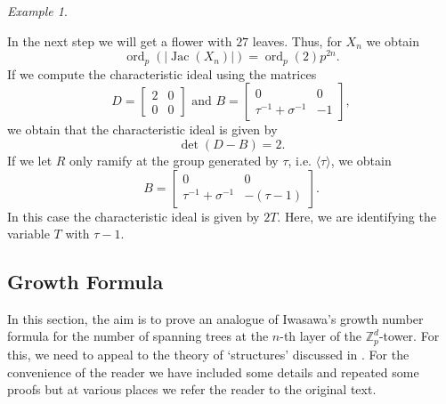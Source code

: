 \documentclass{amsart}
\numberwithin{equation}{section}
\theoremstyle{remark}
\newtheorem{example}[theorem]{Example}
\newcommand{\Jac}{\operatorname{Jac}}
\newcommand{\ord}{\operatorname{ord}}
\newcommand{\Z}{\mathbb{Z}}
\theoremstyle{plain} %
\begin{document}
\begin{example}
\begin{center}
\end{center}
In the next step we will get a flower with $27$ leaves. Thus, for $X_n$ we obtain 
\[
\ord_p(\vert \Jac(X_n)\vert)=\ord_p(2)p^{2n}.
\]
If we compute the characteristic ideal using the matrices 
\[D = \begin{bmatrix}
    2 & 0 \\
    0 & 0
\end{bmatrix} \textrm{ and } B = \begin{bmatrix}
    0 & 0 \\ 
    \tau^{-1}+\sigma^{-1} & -1
\end{bmatrix},
\]
we obtain that the characteristic ideal is given by
\[\det(D-B)=2. \]
If we let $R$ only ramify at the group generated by $\tau$, i.e. $\langle \tau\rangle$, we obtain 
\[
B=\begin{bmatrix}
    0&0\\\tau^{-1}+\sigma^{-1}&-(\tau-1)
\end{bmatrix}.
\]
In this case the characteristic ideal is given by $2T$.
{Here, we are identifying the variable $T$ with $\tau - 1$.}
\end{example}

\subsection{Growth Formula}

In this section, the aim is to prove an analogue of Iwasawa's growth number formula for the number of spanning trees at the $n$-th layer of the $\Z_p^d$-tower.
{For this, we need to appeal to the theory of `structures' discussed in \cite{cuoco-monsky}.
For the convenience of the reader we have included some details and repeated some proofs but at various places we refer the reader to the original text.}
\end{document}
